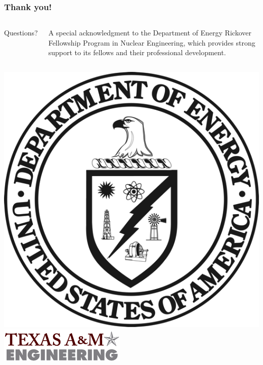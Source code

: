 \documentclass[compress,10pt]{beamer}
\newlength \figwidth
\begin{document}
\begin{frame}[plain]
   \frametitle{Thank you!}

\vspace{25mm}

\begin{columns}[b]


\centering

{\Large Questions?}

\vspace{9mm}
\footnotesize
A special acknowledgment to the Department of Energy Rickover Fellowship Program in Nuclear Engineering, which provides strong support to its fellows and their professional development.

\end{columns}

\vspace{10mm}

\begin{columns}[b]

\centering
{}\includegraphics[width=0.35\figwidth]{images/DOE_logo.png}\\

\centering
{}\includegraphics[width=0.70\figwidth]{images/tamu_engineering.png}\\

\end{columns}

\end{frame}
\end{document}
